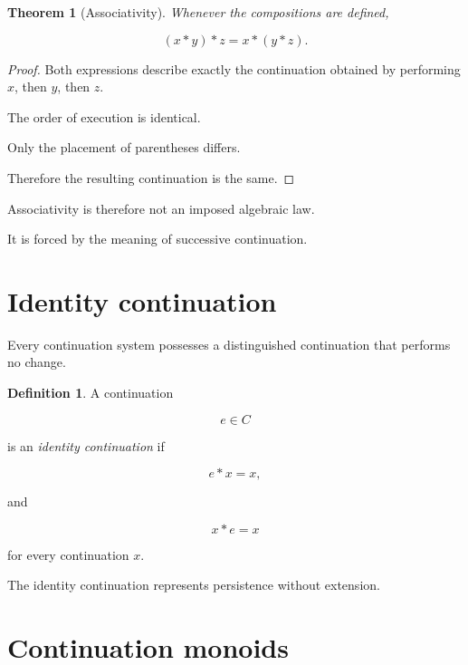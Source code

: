 \documentclass[13pt,openany]{book}
\theoremstyle{plain}
\newtheorem{theorem}{Theorem}[chapter]
\theoremstyle{definition}
\newtheorem{definition}{Definition}[chapter]
\begin{document}
\begin{theorem}[Associativity]
Whenever the compositions are defined,

\[
(x*y)*z
=
x*(y*z).
\]
\end{theorem}

\begin{proof}

Both expressions describe exactly the continuation obtained by performing
$x$, then $y$, then $z$.

The order of execution is identical.

Only the placement of parentheses differs.

Therefore the resulting continuation is the same.

\end{proof}

Associativity is therefore not an imposed algebraic law.

It is forced by the meaning of successive continuation.

\section{Identity continuation}

Every continuation system possesses a distinguished continuation that performs
no change.

\begin{definition}

A continuation

\[
e\in C
\]

is an \emph{identity continuation} if

\[
e*x=x,
\]

and

\[
x*e=x
\]

for every continuation $x$.

\end{definition}

The identity continuation represents persistence without extension.

\section{Continuation monoids}
\end{document}
